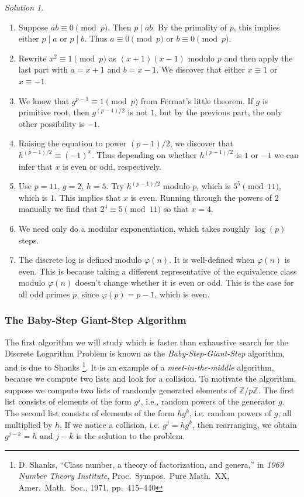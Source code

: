 \documentclass{article}
\theoremstyle{plain}
\theoremstyle{definition}
\theoremstyle{remark}
\newtheorem*{solution}{Solution}
\numberwithin{theorem}{section}
\newcommand{\ZZ}{\mathbb{Z}}
\begin{document}
\begin{solution}
    \begin{enumerate}
        \item Suppose $ab \equiv 0 \pmod{p}$.  Then $p \mid ab$.  By the primality of $p$, this implies either $p \mid a$ or $p\mid b$.  Thus $a \equiv 0 \pmod{p}$ or $b \equiv 0 \pmod{p}$.
        \item Rewrite $x^2 \equiv 1 \pmod{p}$ as $(x+1)(x-1)$ modulo $p$ and then apply the last part with $a = x+1$ and $b=x-1$.  We discover that either $x \equiv 1$ or $x \equiv -1$.
        \item We know that $g^{p-1} \equiv 1 \pmod{p}$ from Fermat's little theorem.  If $g$ is primitive root, then $g^{(p-1)/2}$ is not $1$, but by the previous part, the only other possibility is $-1$.
        \item Raising the equation to power $(p-1)/2$, we discover that $h^{(p-1)/2} \equiv (-1)^x$.  Thus depending on whether $h^{(p-1)/2}$ is $1$ or $-1$ we can infer that $x$ is even or odd, respectively.
        \item Use $p=11$, $g=2$, $h=5$.  Try $h^{(p-1)/2}$ modulo $p$, which is $5^5 \pmod{11}$, which is $1$.  This implies that $x$ is even.  Running through the powers of $2$ manually we find that $2^4 \equiv 5 \pmod{11}$ so that $x = 4$.
        \item We need only do a modular exponentiation, which takes roughly $\log(p)$ steps.
        \item The discrete log is defined modulo $\varphi(n)$.   It is well-defined when $\varphi(n)$ is even.  This is because taking a different representative of the equivalence class modulo $\varphi(n)$ doesn't change whether it is even or odd.   This is the case for all odd primes $p$, since $\varphi(p) = p-1$, which is even.
    \end{enumerate}
\end{solution}


\subsubsection{The Baby-Step Giant-Step Algorithm}
\label{sec:baby-giant}

The first algorithm we will study which is faster than exhaustive search for the Discrete Logarithm Problem is known as the \emph{Baby-Step-Giant-Step} algorithm, and is due to Shanks \footnote{D. Shanks, ``Class number, a theory of factorization, and genera,'' in \emph{1969 Number Theory Institute}, Proc.\ Sympos.\ Pure Math.\ XX, Amer.\ Math.\ Soc., 1971, pp.~415--440}.  It is an example of a \emph{meet-in-the-middle} algorithm, because we compute two lists and look for a collision.  To motivate the algorithm, suppose we compute two lists of randomly generated elements of $\ZZ/p\ZZ$.  The first list consists of elements of the form $g^j$, i.e., random powers of the generator $g$.  The second list consists of elements of the form $hg^k$, i.e. random powers of $g$, all multiplied by $h$.  If we notice a collision, i.e. $g^j = h g^k$, then rearranging, we obtain $g^{j-k} = h$ and $j-k$ is the solution to the problem.  
\end{document}
